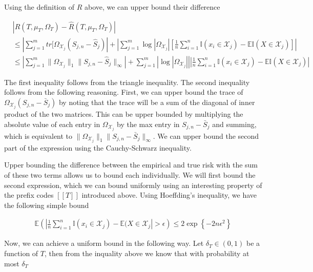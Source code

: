Using the definition of $R$ above, we can upper bound their difference

\begin{align}
  &\left| R(T,\mu_T,\Omega_T) - \hat{R}(T, \mu_T, \Omega_T) \right| \\
  &\le \left| \sum_{j=1}^m tr[\Omega_{\mathcal{X}_j} (S_{j,n} - \hat{S}_j) \right| + 
  \left|
    \sum_{j=1}^m \log|\Omega_{\mathcal{X}_j}|
    \left[
      \frac{1}{n} \sum_{i=1}^n \mathbb{I}(x_i \in \mathcal{X}_j) - \mathbb{E I} (X \in \mathcal{X}_j)
    \right]
  \right| \\
  &\le \left| \sum_{j=1}^m \|\Omega_{\mathcal{X}_j}\|_1 \|S_{j,n} - \hat{S}_j\|_\infty \right| + 
  \sum_{j=1}^m \left| \log|\Omega_{\mathcal{X}_j}| \right|
  \left|
    \frac{1}{n} \sum_{i=1}^n \mathbb{I}(x_i \in \mathcal{X}_j) - \mathbb{E I} (X \in \mathcal{X}_j)
  \right|
\end{align}

The first inequality follows from the triangle inequality. The second
inequality follows from the following reasoning. First, we can upper
bound the trace of $\Omega_{\mathcal{X}_j} (S_{j,n} - \bar{S}_j)$ by
noting that the trace will be a sum of the diagonal of inner product
of the two matrices. This can be upper bounded by multiplying the
absolute value of each entry in $\Omega_{\mathcal{X}_j}$ by the max
entry in $S_{j,n} - \bar{S}_j$ and summing, which is equivalent to
$\|\Omega_{\mathcal{X}_j}\|_1 \|S_{j,n} - \bar{S}_j\|_\infty$. We can
upper bound the second part of the expression using the Cauchy-Schwarz
inequality.

Upper bounding the difference between the empirical and true risk with
the sum of these two terms allows us to bound each individually. We
will first bound the second expression, which we can bound uniformly
using an interesting property of the prefix codes $[[T]]$ introduced
above. Using Hoeffding's inequality, we have the following simple
bound

\begin{align}
  \mathbb{E} \left(
    \left| \frac{1}{n} \sum_{i=1}^n \mathbb{I}(x_i \in \mathcal{X}_j) - 
      \mathbb{E}(X \in \mathcal{X}_j \right| > \epsilon
  \right)
  \le 2 \exp \left\{ - 2 n \epsilon^2 \right\}
\end{align}

Now, we can achieve a uniform bound in the following way. Let
$\delta_T \in (0,1)$ be a function of $T$, then from the inquality
above we know that with probability at most $\delta_T$


